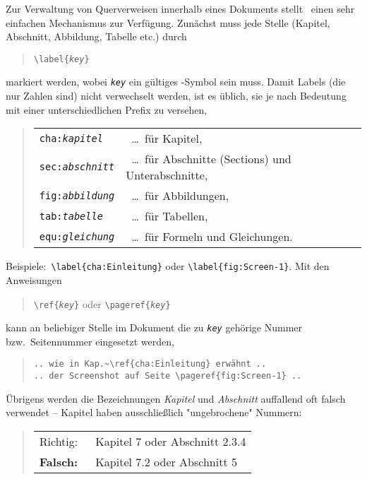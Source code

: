 Zur Verwaltung von Querverweisen innerhalb eines Dokuments stellt
\latex\ einen sehr einfachen Mechanismus zur Verfügung. Zunächst
muss jede Stelle (Kapitel, Abschnitt, Abbildung, Tabelle etc.)
durch
%
\begin{quote}
\verb!\label{!\texttt{\em key}\verb!}!
\end{quote}
%
markiert werden, wobei \texttt{\em key} ein gültiges \latex-Symbol sein
muss. Damit Labels (die nur Zahlen sind) nicht verwechselt werden,
ist es üblich, sie je nach Bedeutung mit einer unterschiedlichen
Prefix zu versehen, \zB\
%
\begin{quote}
\begin{tabular}{ll}
\verb!cha:!\texttt{\em kapitel}   & \ \ldots\ für Kapitel,  \\
\verb!sec:!\texttt{\em abschnitt} & \ \ldots\ für Abschnitte (Sections) und Unterabschnitte, \\
\verb!fig:!\texttt{\em abbildung} & \ \ldots\ für Abbildungen, \\
\verb!tab:!\texttt{\em tabelle}   & \ \ldots\ für Tabellen, \\
\verb!equ:!\texttt{\em gleichung} & \ \ldots\ für Formeln und Gleichungen.\\
\end{tabular}
\end{quote}
%
\noindent Beispiele:\ \verb!\label{cha:Einleitung}! oder
\verb!\label{fig:Screen-1}!. Mit den Anweisungen
%
\begin{quote}
\verb!\ref{!\texttt{\em key}\verb!}! 
\hspace{1em} oder \hspace{1em} 
\verb!\pageref{!\texttt{\em key}\verb!}!
\end{quote}
%
kann an beliebiger Stelle im Dokument die zu \texttt{\em key} gehörige
Nummer bzw.\ Seitennummer eingesetzt werden, \zB\
%
\begin{quote}
\verb!.. wie in Kap.~\ref{cha:Einleitung} erwähnt ..!\\
\verb!.. der Screenshot auf Seite \pageref{fig:Screen-1} ..!
\end{quote}
%
Übrigens werden die Bezeichnungen \emph{Kapitel} und {\em
Abschnitt} auffallend oft falsch verwendet -- Kapitel haben
ausschließlich "ungebrochene" Nummern:
%
\begin{quote}
\begin{tabular}{ll}
   \textrm{Richtig:\ } & Kapitel 7 oder Abschnitt 2.3.4\\
   \textbf{Falsch:\ }  & Kapitel 7.2 oder Abschnitt 5
\end{tabular}
\end{quote}


